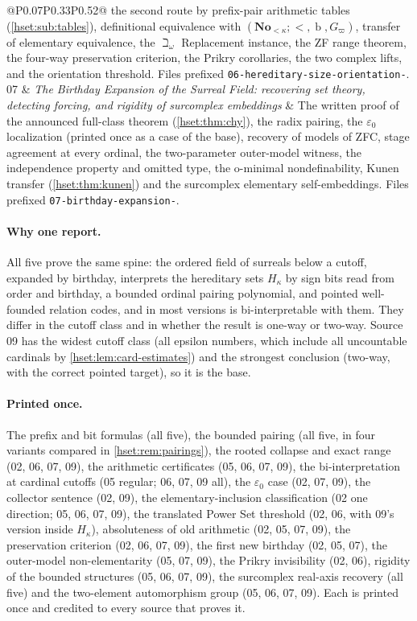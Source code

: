 \documentclass[11pt,letterpaper]{article}
\theoremstyle{definition}
\theoremstyle{remark}
\newcommand{\No}{\mathbf{No}}
\newcommand{\bd}{\operatorname{b}}
\begin{document}
\begin{longtable}{@{}P{0.07\textwidth}P{0.33\textwidth}P{0.52\textwidth}@{}}
the second route by prefix-pair arithmetic tables (\cref{hset:sub:tables}),
definitional equivalence with $(\No_{<\kappa};<,\bd,G_\varpi)$, transfer of
elementary equivalence, the $\beth_\omega$ Replacement instance, the ZF range
theorem, the four-way preservation criterion, the Prikry corollaries, the two
complex lifts, and the orientation threshold. Files prefixed
\texttt{06-hereditary-size-orientation-}.\\[0.4em]
07 & \emph{The Birthday Expansion of the Surreal Field: recovering set theory, detecting forcing, and rigidity of surcomplex embeddings} &
The written proof of the announced full-class theorem (\cref{hset:thm:chy}),
the radix pairing, the $\varepsilon_0$ localization (printed once as a case of
the base), recovery of models of ZFC, stage agreement at every ordinal, the
two-parameter outer-model witness, the independence property and omitted type,
the o-minimal nondefinability, Kunen transfer (\cref{hset:thm:kunen}) and the
surcomplex elementary self-embeddings. Files prefixed
\texttt{07-birthday-expansion-}.\\
\bottomrule
\end{longtable}

\paragraph{Why one report.} All five prove the same spine: the ordered field
of surreals below a cutoff, expanded by birthday, interprets the hereditary
sets $H_\kappa$ by sign bits read from order and birthday, a bounded ordinal
pairing polynomial, and pointed well-founded relation codes, and in most
versions is bi-interpretable with them. They differ in the cutoff class and in
whether the result is one-way or two-way. Source 09 has the widest cutoff class
(all epsilon numbers, which include all uncountable cardinals by
\cref{hset:lem:card-estimates}) and the strongest conclusion (two-way, with the
correct pointed target), so it is the base.

\paragraph{Printed once.} The prefix and bit formulas (all five), the bounded
pairing (all five, in four variants compared in \cref{hset:rem:pairings}), the
rooted collapse and exact range (02, 06, 07, 09), the arithmetic certificates
(05, 06, 07, 09), the bi-interpretation at cardinal cutoffs (05 regular; 06, 07,
09 all), the $\varepsilon_0$ case (02, 07, 09), the collector sentence (02, 09),
the elementary-inclusion classification (02 one direction; 05, 06, 07, 09),
the translated Power Set threshold (02, 06, with 09's version inside
$H_\kappa$), absoluteness of old arithmetic (02, 05, 07, 09), the preservation
criterion (02, 06, 07, 09), the first new birthday (02, 05, 07), the
outer-model non-elementarity (05, 07, 09), the Prikry invisibility (02, 06),
rigidity of the bounded structures (05, 06, 07, 09), the surcomplex real-axis
recovery (all five) and the two-element automorphism group (05, 06, 07, 09).
Each is printed once and credited to every source that proves it.
\end{document}
